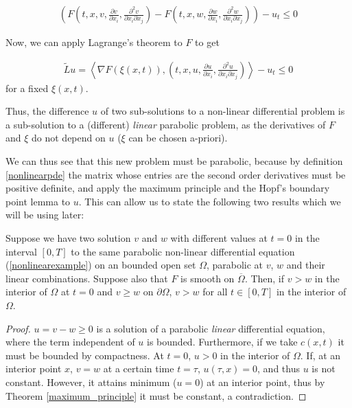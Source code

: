 \begin{align*}
	\left( F\left(t, x, v, \frac{\partial v}{\partial x_i} , \frac{\partial^2 v}{\partial x_i \partial x_j}\right) - F\left(t, x, w, \frac{\partial w}{\partial x_i} , \frac{\partial^2 w}{\partial x_i \partial x_j}\right)\right)-u_t \leq 0
\end{align*}

Now, we can apply Lagrange's theorem to $F$ to get 

\begin{align*}
	\tilde{L}u= \left\langle \nabla F(\xi(x, t)), \left(t, x, u, \frac{\partial u}{\partial x_i} , \frac{\partial^2 u}{\partial x_i \partial x_j}\right) \right\rangle-u_t \leq 0
\end{align*}
for a fixed $\xi(x, t)$.


Thus, the difference $u$ of two sub-solutions to a non-linear differential problem is a sub-solution to a (different) \textit{linear} parabolic problem, as the derivatives of $F$ and $\xi$ do not depend on $u$ ($\xi$ can be chosen a-priori).

We can thus see that this new problem must be parabolic, because by definition \ref{nonlinearpde} the matrix whose entries are the second order derivatives must be positive definite, and apply the maximum principle and the Hopf's boundary point lemma to $u$. This can allow us to state the following two results which we will be using later:

\begin{proposition}
	\label{firstapplication}
	Suppose we have two solution $v$ and $w$ with different values at $t=0$ in the interval $[0, T]$ to the same parabolic non-linear differential equation (\ref{nonlinearexample}) on an bounded open set $\Omega$, parabolic at $v$, $w$ and their linear combinations. Suppose also that $F$ is smooth on  $\overline{\Omega}$. Then, if $v>w$ in the interior of $\Omega$ at $t=0$ and $v\geq w$ on $\partial\Omega$,  $v>w$ for all $t\in[0, T]$ in the interior of $\Omega$.
\end{proposition}

\begin{proof}
	$u=v-w\geq 0$ is a solution of a parabolic \textit{linear} differential equation, where the term independent of $u$ is bounded. Furthermore, if we take $c(x, t)$ it must be bounded by compactness. At $t=0$, $u>0$ in the interior of $\Omega$. If, at an interior point $x$, $v=w$ at a certain time $t=\tau$, $u(\tau, x)=0$, and thus $u$ is not constant. However, it attains minimum ($u=0$) at an interior point, thus by Theorem \ref{maximum_principle} it must be constant, a contradiction. 
\end{proof}


